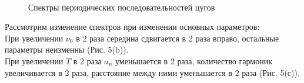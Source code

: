 \documentclass[a4paper, 12pt]{article}%
\begin{document}
	 \begin{figure}[H]
	 	\centering
	 	\qquad
	 	\\
	 	\qquad
	 	\caption{Спектры периодических последовательностей цугов}
	 \end{figure}
 	Рассмотрим изменение спектров при изменении основных параметров:\\
 	При увеличении $\nu_0$ в 2 раза середина сдвигается в 2 раза вправо, остальные параметры неизменны (Рис. 5(b)). \\
 	При увеличении $T$ в 2 раза $a_n$ уменьшается в 2 раза, количество гармоник увеличивается в 2 раза, расстояние между ними уменьшается в 2 раза (Рис. 5(с)). \\
\end{document}
